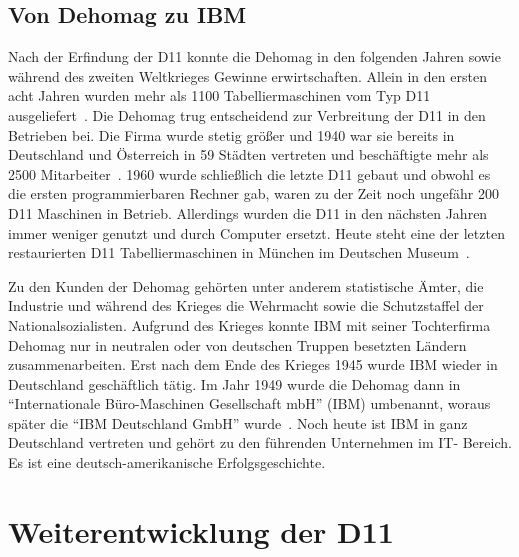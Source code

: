\documentclass[parskip=half]{scrartcl}
\begin{document}
\subsection{Von Dehomag zu IBM}

Nach der Erfindung der D11 konnte die Dehomag in den folgenden Jahren sowie
während des zweiten Weltkrieges Gewinne erwirtschaften. Allein in den ersten
acht Jahren wurden mehr als 1100 Tabelliermaschinen vom Typ D11
ausgeliefert~\cite{Kist95}. Die Dehomag trug entscheidend zur Verbreitung der
D11 in den Betrieben bei. Die Firma wurde stetig größer und 1940 war sie
bereits in Deutschland und Österreich in 59 Städten vertreten und beschäftigte
mehr als 2500 Mitarbeiter~\cite{dingwerth}. 1960 wurde schließlich die
letzte D11 gebaut und obwohl es die ersten programmierbaren Rechner gab, waren
zu der Zeit noch ungefähr 200 D11 Maschinen in Betrieb. Allerdings wurden die
D11 in den nächsten Jahren immer weniger genutzt und durch Computer ersetzt.
Heute steht eine der letzten restaurierten D11 Tabelliermaschinen in München im
Deutschen Museum~\cite{Kist95}.

Zu den Kunden der Dehomag gehörten unter anderem statistische Ämter, die
Industrie und während des Krieges die Wehrmacht sowie die Schutzstaffel der
Nationalsozialisten. Aufgrund des Krieges konnte IBM mit seiner Tochterfirma
Dehomag nur in neutralen oder von deutschen Truppen besetzten Ländern
zusammenarbeiten. Erst nach dem Ende des Krieges 1945 wurde IBM wieder in
Deutschland geschäftlich tätig. Im Jahr 1949 wurde die Dehomag dann in
\enquote{Internationale Büro-Maschinen Gesellschaft mbH} (IBM) umbenannt,
woraus später die \enquote{IBM Deutschland GmbH} wurde~\cite{sendler}.
Noch heute ist IBM in ganz Deutschland vertreten und gehört zu den führenden
Unternehmen im IT- Bereich. Es ist eine deutsch-amerikanische
Erfolgsgeschichte.

\section{Weiterentwicklung der D11}
\end{document}
